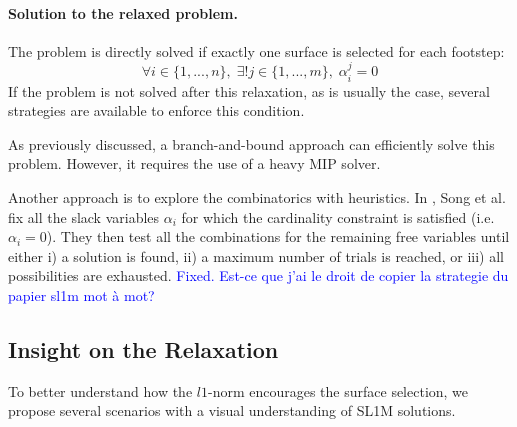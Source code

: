 \paragraph{Solution to the relaxed problem.\label{par:sl1m:solution_relaxed_heuristics}}
The problem is directly solved if exactly one surface is selected for each footstep:
\begin{equation}
    \label{eq:sl1m:pb_solved}
    \forall i \in \{1,...,n\},\; \exists! j \in \{1,...,m\},\; \alpha^j_i = 0
\end{equation}
If the problem is not solved after this relaxation, as is usually the case, several strategies are available to enforce this condition.

As previously discussed, a branch-and-bound approach can efficiently solve this problem. 
However, it requires the use of a heavy MIP solver.

Another approach is to explore the combinatorics with heuristics.
In \cite{sl1m_v2}, Song et al. fix all the slack variables $\alpha_i$ for which the cardinality constraint is satisfied (i.e. $\alpha_i=0$). 
They then test all the combinations for the remaining free variables until either i) a solution is found, ii) a maximum number of trials is reached, or iii) all possibilities are exhausted.  \textcolor{blue}{Fixed. Est-ce que j'ai le droit de copier la strategie du papier sl1m mot à mot?}

\subsection{Insight on the Relaxation}
\label{subsub:insight_l1}
To better understand how the $l1$-norm encourages the surface selection, we propose several scenarios with a visual understanding of SL1M solutions.

